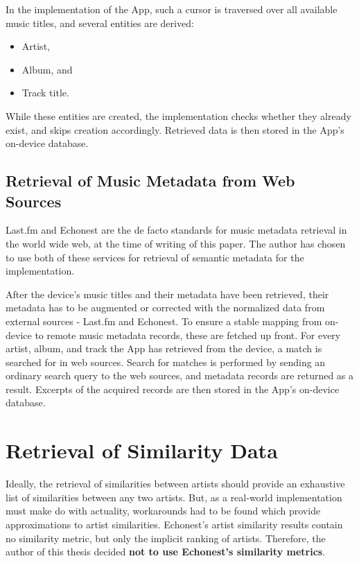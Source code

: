 In the implementation of the App, such a cursor is traversed over all available music titles, and several entities are derived:

\begin{itemize}
	\item Artist,
	\item Album, and
	\item Track title.
\end{itemize}

While these entities are created, the implementation checks whether they already exist, and skips creation accordingly. Retrieved data is then stored in the App's on-device database.

\subsection{Retrieval of Music Metadata from Web Sources}

Last.fm \cite{url:lastfm} and Echonest \cite{url:echonest} are the de facto standards for music metadata retrieval in the world wide web, 
at the time of writing of this paper. The author has chosen to use both of these services for retrieval 
of semantic metadata for the implementation. 

After the device's music titles and their metadata have been retrieved, their metadata has to be augmented or corrected with the normalized data from external sources - Last.fm and Echonest. To ensure a stable mapping from on-device to remote music metadata records, these are fetched up front. For every artist, album, and track the App has retrieved from the device, a match is searched for in web sources. Search for matches is performed by sending an ordinary search query to the web sources, and metadata records are returned as a result. Excerpts of the acquired records are then stored in the App's on-device database.

\section{Retrieval of Similarity Data}

Ideally, the retrieval of similarities between artists should provide an exhaustive list of similarities between any two artists. But, as a real-world implementation must make do with actuality, workarounds had to be found which provide approximations to artist similarities.
Echonest's artist similarity results contain no similarity metric, but only the implicit ranking of artists. Therefore, the author of this thesis decided \textbf{not to use Echonest's similarity metrics}.

